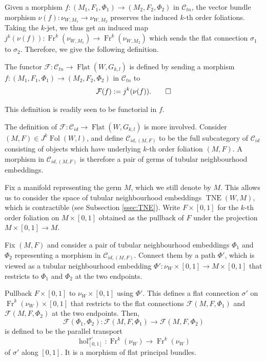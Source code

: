 \documentclass[10pt]{amsart}
\newcommand{\F}{{\mathcal{F}}}
\newcommand{\hol}{{\operatorname{hol}}}
\newcommand{\FolObj}{{\operatorname{Fol}}}
\newcommand{\FlatCat}{{\underline{\operatorname{Flat}}}}
\newcommand{\TNE}{{\operatorname{TNE}}}
\newcommand{\Fr}{{\operatorname{Fr}}}
\numberwithin{theoremalpha}{section}
\numberwithin{equation}{section}
\numberwithin{definition}{section}
\numberwithin{theorem}{section}
\numberwithin{proposition}{section}
\numberwithin{lemma}{section}
\numberwithin{example}{section}
\numberwithin{remark}{section}
\numberwithin{corollary}{section}
\numberwithin{question}{section}
\numberwithin{problem}{section}
\numberwithin{assumption}{section}
\theoremstyle{named}
\numberwithin{equation}{section}
\begin{document}
Given a morphism $f: (M_{1}, F_{1}, \Phi_{1}) \to (M_{2}, F_{2}, \Phi_{2})$ in $\mathcal{C}_{tn}$, the vector bundle morphism $\nu(f) : \nu_{W, M_{1}} \to \nu_{W, M_{2}}$ preserves the induced $k$-th order foliations. Taking the $k$-jet, we thus get an induced map $j^{k}(\nu(f)) : \Fr^{k}( \nu_{W, M_{1}}) \to \Fr^{k}( \nu_{W, M_{2}})$ which sends the flat connection $\sigma_{1}$ to $\sigma_{2}$. Therefore, we give the following definition. 
\begin{definition} \label{def:ctn}
The functor $\F : \mathcal{C}_{tn} \to \FlatCat(W,G_{k,l})$ is defined by sending a morphism $f: (M_{1}, F_{1}, \Phi_{1}) \to (M_{2}, F_{2}, \Phi_{2})$ in $\mathcal{C}_{tn}$ to
\begin{equation*}
\F(f) := j^k(\nu(f)). \hfill \qedhere
\end{equation*}
\end{definition}
This definition is readily seen to be functorial in $f$.

The definition of $\F : \mathcal{C}_{id} \to \FlatCat(W,G_{k,l})$ is more involved. Consider $(M,F) \in J^k\FolObj(W,l)$, and define $\mathcal{C}_{id,(M,F)}$ to be the full subcategory of $\mathcal{C}_{id}$ consisting of objects which have underlying $k$-th order foliation $(M,F)$. A morphism in $\mathcal{C}_{id,(M,F)}$ is therefore a pair of germs of tubular neighbourhood embeddings. 

Fix a manifold representing the germ $M$, which we still denote by $M$. This allows us to consider the space of tubular neighbourhood embeddings $\TNE(W,M)$, which is contractible (see Subsection \ref{ssec:TNE}). Write $F \times [0,1]$ for the $k$-th order foliation on $M \times [0,1]$ obtained as the pullback of $F$ under the projection $M \times [0,1] \rightarrow M$. 
\begin{definition} \label{def:definitionOfF2}
Fix $(M,F)$ and consider a pair of tubular neighbourhood embeddings $\Phi_1$ and $\Phi_2$ representing a morphism in $\mathcal{C}_{id,(M,F)}$. Connect them by a path $\Phi'$, which is viewed as a tubular neighbourhood embedding $\Phi' : \nu_{W} \times [0,1] \to M \times [0,1]$ that restricts to $\Phi_1$ and $\Phi_2$ at the two endpoints. 

Pullback $F \times [0,1]$ to $\nu_{W} \times [0,1]$ using $\Phi'$. This defines a flat connection $\sigma'$ on $\Fr^{k}(\nu_{W}) \times [0,1]$ that restricts to the flat connections $\F(M,F,\Phi_{1})$ and $\F(M,F,\Phi_{2})$ at the two endpoints. Then, 
\[ \F(\Phi_1,\Phi_2): \F(M,F,\Phi_{1}) \rightarrow \F(M,F,\Phi_{2})  \]
is defined to be the parallel transport
\[ \hol^{\sigma'}_{[0,1]}: \Fr^{k}(\nu_{W}) \rightarrow \Fr^{k}(\nu_{W}) \]
of $\sigma'$ along $[0,1]$. It is a morphism of flat principal bundles.
\end{definition}
\end{document}
